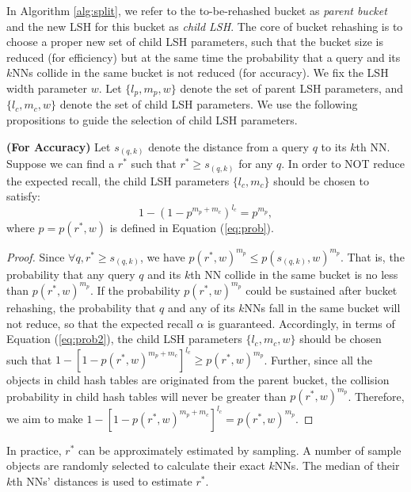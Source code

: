 In Algorithm \ref{alg:split}, we refer to the to-be-rehashed bucket as \emph{parent bucket} and the new LSH for this bucket as \emph{child LSH}. The core of bucket rehashing is to choose a proper new set of child LSH parameters, such that the bucket size is reduced (for efficiency) but at the same time the probability that a query and its $k$NNs collide in the same bucket is not reduced (for accuracy). We fix the LSH width parameter $w$. Let $\{l_p,m_p,w\}$ denote the set of parent LSH parameters, and $\{l_c,m_c,w\}$ denote the set of child LSH parameters. We use the following propositions to guide the selection of child LSH parameters.

\begin{prop}
\label{prop:accuracy}
\textbf{(For Accuracy)} Let $s_{(q,k)}$ denote the distance from a query $q$ to its $k$th NN. Suppose we can find a $r^*$ such that $r^*\geq s_{(q,k)}$ for any $q$. In order to NOT reduce the expected recall, the child LSH parameters $\{l_c,m_c\}$ should be chosen to satisfy:
\begin{equation}\label{eq:sustainprob}
    1-(1-p^{m_p+m_{c}})^{l_{c}}=p^{m_{p}},
\end{equation}
where $p=p(r^*,w)$ is defined in Equation (\ref{eq:prob}).
\end{prop}
\begin{proof}
Since $\forall q, r^*\geq s_{(q,k)}$, we have $p(r^*,w)^{m_p}\leq p(s_{(q,k)},w)^{m_p}$. That is, the probability that any query $q$ and its $k$th NN collide in the same bucket is no less than $p(r^*,w)^{m_p}$. If the probability $p(r^*,w)^{m_p}$ could be sustained after bucket rehashing, the probability that $q$ and any of its $k$NNs fall in the same bucket will not reduce, so that the expected recall $\alpha$ is guaranteed. Accordingly, in terms of Equation (\ref{eq:prob2}), the child LSH parameters $\{l_c,m_c,w\}$ should be chosen such that $1-[1-p(r^*,w)^{m_p+m_{c}}]^{l_{c}}\geq p(r^*,w)^{m_{p}}$. Further, since all the objects in child hash tables are originated from the parent bucket, the collision probability in child hash tables will never be greater than $p(r^*,w)^{m_{p}}$. Therefore, we aim to make $1-[1-p(r^*,w)^{m_p+m_{c}}]^{l_{c}}=p(r^*,w)^{m_{p}}$.
\end{proof}

In practice, $r^*$ can be approximately estimated by sampling. A number of sample objects are randomly selected to calculate their exact $k$NNs. The median of their $k$th NNs' distances is used to estimate $r^*$.


